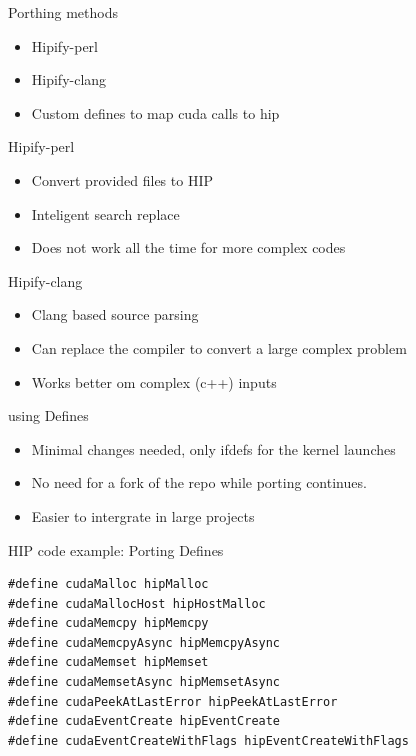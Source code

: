 \documentclass[aspectratio=169]{beamer}
\begin{document}
\begin{frame}{Porthing methods}
\begin{itemize}
    \item Hipify-perl 
    \item Hipify-clang
    \item Custom defines to map cuda calls to hip
\end{itemize}
\end{frame}

\begin{frame}{Hipify-perl}
\begin{itemize}
    \item Convert provided files to HIP
    \item Inteligent search replace
    \item Does not work all the time for more complex codes
\end{itemize}

\end{frame}

\begin{frame}{Hipify-clang}
\begin{itemize}
    \item Clang based source parsing
    \item Can replace the compiler to convert a large complex problem
    \item Works better om complex (c++) inputs
\end{itemize}
\end{frame}

\begin{frame}{using Defines}
\begin{itemize}
    \item Minimal changes needed, only ifdefs for the kernel launches 
    \item No need for a fork of the repo while porting continues.
    \item Easier to intergrate in large projects
\end{itemize}
\end{frame}

\begin{frame}[fragile]{HIP code example: Porting Defines}

\begin{verbatim}
#define cudaMalloc hipMalloc
#define cudaMallocHost hipHostMalloc
#define cudaMemcpy hipMemcpy
#define cudaMemcpyAsync hipMemcpyAsync
#define cudaMemset hipMemset
#define cudaMemsetAsync hipMemsetAsync
#define cudaPeekAtLastError hipPeekAtLastError
#define cudaEventCreate hipEventCreate
#define cudaEventCreateWithFlags hipEventCreateWithFlags
\end{verbatim}
\end{frame}
\end{document}
